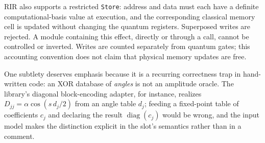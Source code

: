 RIR also supports a restricted \texttt{Store}: address and data must each
have a definite computational-basis value at execution, and the
corresponding classical memory cell is updated without changing the
quantum registers. Superposed writes are rejected. A module containing
this effect, directly or through a call, cannot be controlled or inverted.
Writes are counted separately from quantum gates; this accounting
convention does not claim that physical memory updates are free.

One subtlety deserves emphasis because it is a recurring correctness trap in
hand-written code: an XOR database of \emph{angles} is not an amplitude
oracle.  The library's diagonal block-encoding adapter, for instance,
realizes $D_{jj}=\alpha\cos(s\,d_j/2)$ from an angle table $d_j$; feeding a
fixed-point table of coefficients $c_j$ and declaring the result
$\operatorname{diag}(c_j)$ would be wrong, and the input model makes the
distinction explicit in the slot's semantics rather than in a comment.

